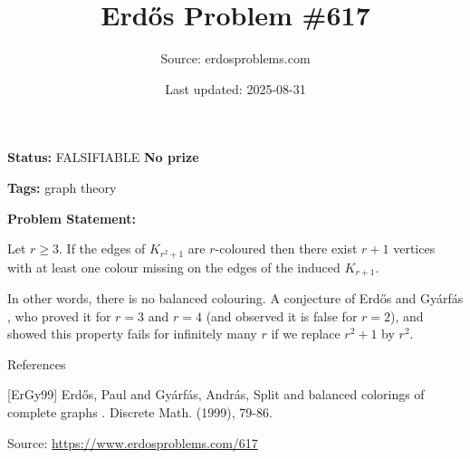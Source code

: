 \documentclass{article}
\title{Erd\H{o}s Problem \#617}
\date{Last updated: 2025-08-31}
\author{Source: erdosproblems.com}
\begin{document}
\maketitle

\noindent\textbf{Status:} FALSIFIABLE \quad \textbf{No prize}

\noindent\textbf{Tags:} graph theory

\medskip

\noindent\textbf{Problem Statement:}

Let $r\geq 3$. If the edges of $K_{r^2+1}$ are $r$-coloured then there exist $r+1$ vertices with at least one colour missing on the edges of the induced $K_{r+1}$.




In other words, there is no balanced colouring. A conjecture of Erd\H{o}s and Gy\'{a}rf\'{a}s \cite{ErGy99}, who proved it for $r=3$ and $r=4$ (and observed it is false for $r=2$), and showed this property fails for infinitely many $r$ if we replace $r^2+1$ by $r^2$.




References

[ErGy99] Erd\H{o}s, Paul and Gy\'{a}rf\'{a}s, Andr\'{a}s, Split and balanced colorings of complete graphs . Discrete Math. (1999), 79-86.

\bigskip
\noindent\small{Source: \url{https://www.erdosproblems.com/617}}
\end{document}
